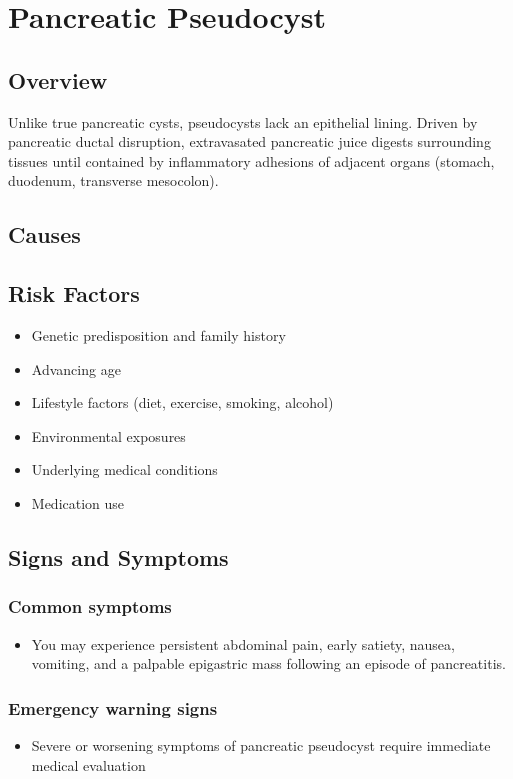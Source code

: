 \chapter{Pancreatic Pseudocyst}
\label{sec:Pancreatic Pseudocyst}

\section{Overview}
Unlike true pancreatic cysts, pseudocysts lack an epithelial lining. Driven by pancreatic ductal disruption, extravasated pancreatic juice digests surrounding tissues until contained by inflammatory adhesions of adjacent organs (stomach, duodenum, transverse mesocolon).
\section{Causes}
\section{Risk Factors}

\begin{itemize}[noitemsep]
  \item Genetic predisposition and family history
  \item Advancing age
  \item Lifestyle factors (diet, exercise, smoking, alcohol)
  \item Environmental exposures
  \item Underlying medical conditions
  \item Medication use
\end{itemize}
\section{Signs and Symptoms}

\subsection{Common symptoms}
\begin{itemize}[noitemsep]
  \item You may experience persistent abdominal pain, early satiety, nausea, vomiting, and a palpable epigastric mass following an episode of pancreatitis. 
  \end{itemize}

\subsection{Emergency warning signs}
\begin{itemize}[noitemsep]
  \item Severe or worsening symptoms of pancreatic pseudocyst require immediate medical evaluation
\end{itemize}
